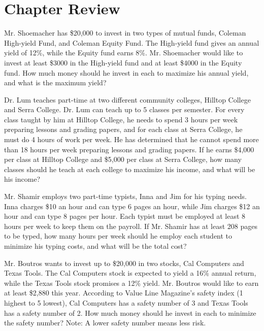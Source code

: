\section{Chapter Review}

\begin{puzzle}
    Mr. Shoemacher has \$20,000 to invest in two types of mutual funds, Coleman High-yield Fund,
    and Coleman Equity Fund. The High-yield fund gives an annual yield of 12\%, while the Equity
    fund earns 8\%. Mr. Shoemacher would like to invest at least \$3000 in the High-yield fund and at
    least \$4000 in the Equity fund. How much money should he invest in each to maximize his annual
    yield, and what is the maximum yield?

\end{puzzle}

\begin{puzzle}
    Dr. Lum teaches part-time at two different community colleges, Hilltop College and Serra College.
    Dr. Lum can teach up to 5 classes per semester. For every class taught by him at Hilltop College,
    he needs to spend 3 hours per week preparing lessons and grading papers, and for each class at
    Serra College, he must do 4 hours of work per week. He has determined that he cannot spend more
    than 18 hours per week preparing lessons and grading papers. If he earns \$4,000 per class at Hilltop
    College and \$5,000 per class at Serra College, how many classes should he teach at each college to
    maximize his income, and what will be his income?
\end{puzzle}

\begin{puzzle}
    Mr. Shamir employs two part-time typists, Inna and Jim for his typing needs. Inna charges \$10
    an hour and can type 6 pages an hour, while Jim charges \$12 an hour and can type 8 pages per
    hour. Each typist must be employed at least 8 hours per week to keep them on the payroll. If
    Mr. Shamir has at least 208 pages to be typed, how many hours per week should he employ each
    student to minimize his typing costs, and what will be the total cost?

\end{puzzle}

\begin{puzzle}
    Mr. Boutros wants to invest up to \$20,000 in two stocks, Cal Computers and Texas Tools. The Cal
    Computers stock is expected to yield a 16\% annual return, while the Texas Tools stock promises
    a 12\% yield. Mr. Boutros would like to earn at least \$2,880 this year. According to Value Line
    Magazine's safety index (1 highest to 5 lowest), Cal Computers has a safety number of 3 and Texas
    Tools has a safety number of 2. How much money should he invest in each to minimize the safety
    number? Note: A lower safety number means less risk.
\end{puzzle}

